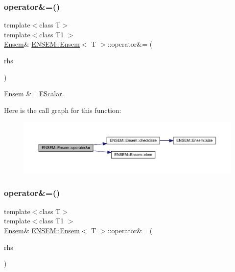 \subsubsection{\texorpdfstring{operator\&=()}{operator\&=()}\hspace{0.1cm}{\footnotesize\ttfamily [2/3]}}
{\footnotesize\ttfamily template$<$class T$>$ \\
template$<$class T1 $>$ \\
\mbox{\hyperlink{classENSEM_1_1Ensem}{Ensem}}\& \mbox{\hyperlink{classENSEM_1_1Ensem}{E\+N\+S\+E\+M\+::\+Ensem}}$<$ T $>$\+::operator\&= (\begin{DoxyParamCaption}\item[{const \mbox{\hyperlink{classENSEM_1_1EScalar}{E\+Scalar}}$<$ T1 $>$ \&}]{rhs }\end{DoxyParamCaption})\hspace{0.3cm}{\ttfamily [inline]}}



\mbox{\hyperlink{classENSEM_1_1Ensem}{Ensem}} \&= \mbox{\hyperlink{classENSEM_1_1EScalar}{E\+Scalar}}. 

Here is the call graph for this function\+:
\nopagebreak
\begin{figure}[H]
\begin{center}
\leavevmode
\includegraphics[width=350pt]{d7/d3e/classENSEM_1_1Ensem_ab5e9900522968210e53ec66b09a402fe_cgraph}
\end{center}
\end{figure}
\mbox{\label{classENSEM_1_1Ensem_ab5e9900522968210e53ec66b09a402fe}} 
\subsubsection{\texorpdfstring{operator\&=()}{operator\&=()}\hspace{0.1cm}{\footnotesize\ttfamily [3/3]}}
{\footnotesize\ttfamily template$<$class T$>$ \\
template$<$class T1 $>$ \\
\mbox{\hyperlink{classENSEM_1_1Ensem}{Ensem}}\& \mbox{\hyperlink{classENSEM_1_1Ensem}{E\+N\+S\+E\+M\+::\+Ensem}}$<$ T $>$\+::operator\&= (\begin{DoxyParamCaption}\item[{const \mbox{\hyperlink{classENSEM_1_1EScalar}{E\+Scalar}}$<$ T1 $>$ \&}]{rhs }\end{DoxyParamCaption})\hspace{0.3cm}{\ttfamily [inline]}}




